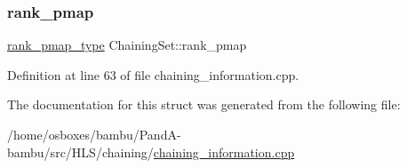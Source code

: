 \mbox{\label{structChainingSet_ab988ce8b78fec747012862e62b8c598b}} 
\subsubsection{\texorpdfstring{rank\+\_\+pmap}{rank\_pmap}}
{\footnotesize\ttfamily \hyperlink{structChainingSet_aebbcd031d5f20a8ff678fff4688c9d77}{rank\+\_\+pmap\+\_\+type} Chaining\+Set\+::rank\+\_\+pmap}



Definition at line 63 of file chaining\+\_\+information.\+cpp.



The documentation for this struct was generated from the following file\+:\begin{DoxyCompactItemize}
\item 
/home/osboxes/bambu/\+Pand\+A-\/bambu/src/\+H\+L\+S/chaining/\hyperlink{chaining__information_8cpp}{chaining\+\_\+information.\+cpp}\end{DoxyCompactItemize}
